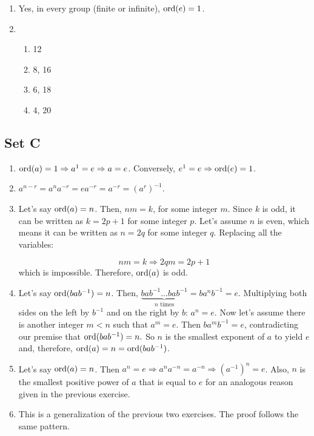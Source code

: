\begin{enumerate}
    \item Yes, in every group (finite or infinite), $ \operatorname{ord}(e) = 1 $. 

    \item
        \begin{enumerate}
            \item 12

            \item 8, 16

            \item 6, 18

            \item 4, 20
        \end{enumerate}
\end{enumerate}

\subsection{Set C}
\begin{enumerate}
    \item $ \operatorname{ord}(a) = 1 \Rightarrow a^1 = e \Rightarrow a = e $. Conversely, $ e^1 = e \Rightarrow \operatorname{ord}(e) = 1 $.

    \item $ a^{n - r} = a^na^{-r} = ea^{-r} = a^{-r} = (a^r)^{-1} $.

    \item Let's say $ \operatorname{ord}(a) = n $. Then, $ nm = k $, for some integer $ m $. Since $ k $ is odd, it can be written as $ k = 2p + 1 $ for some integer $ p $. Let's assume $ n $ is even, which means it can be written as $ n = 2q $ for some integer $ q $. Replacing all the variables:

    $$ nm = k \Rightarrow 2qm = 2p + 1 $$
    which is impossible. Therefore, $ \operatorname{ord}(a) $ is odd.

    \item Let's say $ \operatorname{ord}(bab^{-1}) = n $. Then, $ \underbrace{bab^{-1}\ldots bab^{-1}}_\text{$n$ times} = ba^nb^{-1} = e $. Multiplying both sides on the left by $ b^{-1} $ and on the right by $ b $: $ a^n = e $. Now let's assume there is another integer $ m < n$ such that $ a^m = e $. Then $ ba^mb^{-1} = e $, contradicting our premise that $ \operatorname{ord}(bab^{-1}) = n. $ So $ n $ is the smallest exponent of $ a $ to yield $ e $ and, therefore, $ \operatorname{ord}(a) = n = \operatorname{ord}(bab^{-1}) $.

    \item Let's say $ \operatorname{ord}(a) = n $. Then $ a^n = e \Rightarrow a^na^{-n} = a^{-n} \Rightarrow (a^{-1})^n = e$. Also, $ n $ is the smallest positive power of $ a $ that is equal to $ e $ for an analogous reason given in the previous exercise.

    \item This is a generalization of the previous two exercises. The proof follows the same pattern.
\end{enumerate}

